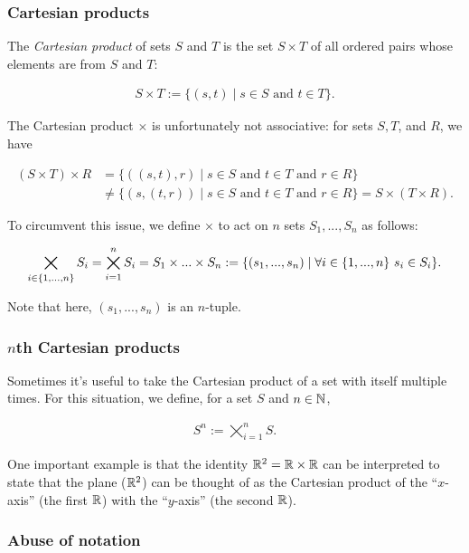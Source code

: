 \subsubsection*{Cartesian products}

The \textit{Cartesian product} of sets $S$ and $T$ is the set $S \times T$ of all ordered pairs whose elements are from $S$ and $T$:

\begin{align*}
    S \times T := \{(s, t) \mid s \in S \text{ and } t \in T\}.
\end{align*}

The Cartesian product $\times$ is unfortunately not associative: for sets $S, T$, and $R$, we have

\begin{align*}
    (S \times T) \times R &= \{ ((s, t), r) \mid s \in S \text{ and } t \in T \text{ and } r \in R\} \\ &\neq \{(s, (t, r)) \mid s \in S \text{ and } t \in T \text{ and } r \in R\} = S \times (T \times R).
\end{align*}

To circumvent this issue, we define $\times$ to act on $n$ sets $S_1, ..., S_n$ as follows:

\begin{align*}
    \bigtimes_{i \in \{1, ..., n\}} S_i = \bigtimes_{i = 1}^n S_i = S_1 \times ... \times S_n := \{(s_1, ..., s_n) \mid \forall i \in \{1, ..., n\} \text{ } s_i \in S_i\}.
\end{align*}

Note that here, $(s_1, ..., s_n)$ is an $n$-tuple.

\subsubsection*{$n$th Cartesian products}

Sometimes it's useful to take the Cartesian product of a set with itself multiple times. For this situation, we define, for a set $S$ and $n \in \mathbb{N}$,

\begin{align*}
    S^n := \bigtimes_{i = 1}^n S.
\end{align*}

One important example is that the identity $\mathbb{R}^2 = \mathbb{R} \times \mathbb{R}$ can be interpreted to state that the plane ($\mathbb{R}^2$) can be thought of as the Cartesian product of the ``$x$-axis'' (the first $\mathbb{R}$) with the ``$y$-axis'' (the second $\mathbb{R}$).

\subsubsection*{Abuse of notation}


